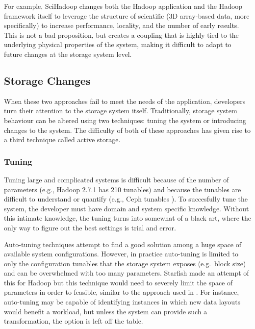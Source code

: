 \documentclass[10pt,twocolumn]{article}
\begin{document}
For example, SciHadoop \autocites[
]{buck:hpc2011-scihadoop}{buck:sc2013-scidr} changes both the Hadoop
application and the Hadoop framework itself to leverage the structure of
scientific (3D array-based data, more specifically) to increase
performance, locality, and the number of early results. This is not a
bad proposition, but creates a coupling that is highly tied to the
underlying physical properties of the system, making it difficult to
adapt to future changes at the storage system level.

\subsection{Storage Changes}\label{storage-changes}

When these two approaches fail to meet the needs of the application,
developers turn their attention to the storage system itself.
Traditionally, storage system behaviour can be altered using two
techniques: tuning the system or introducing changes to the system. The
difficulty of both of these approaches has given rise to a third
technique called active storage.

\subsubsection{Tuning}\label{tuning}

Tuning large and complicated systems is difficult because of the number
of parameters (e.g., Hadoop 2.7.1 has 210 tunables) and because the
tunables are difficult to understand or quantify (e.g., Ceph tunables
\autocite{sevilla:sc15-mantle}). To succesfully tune the system, the
developer must have domain and system specific knowledge. Without this
intimate knowledge, the tuning turns into somewhat of a black art, where
the only way to figure out the best settings is trial and error.

Auto-tuning techniques attempt to find a good solution among a huge
space of available system configurations. However, in practice
auto-tuning is limited to only the configuration tunables that the
storage system exposes (e.g.~block size) and can be overwhelmed with too
many parameters. Starfish \autocite{herodotou:cidr2011-starfish} made an
attempt of this for Hadoop but this technique would need to severely
limit the space of parameters in order to feasible, similar to the
approach used in \autocite{behzad:sc2013-autotuning}. For instance,
auto-tuning may be capable of identifying instances in which new data
layouts would benefit a workload, but unless the system can provide such
a transformation, the option is left off the table.
\end{document}
